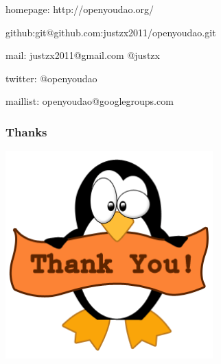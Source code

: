 \documentclass[10pt]{beamer}
\begin{document}
\begin{CJK*}{UTF8}{song}
\begin{frame}
\begin{itemize}
\large{
  \item homepage: http://openyoudao.org/
  \item github:git@github.com:justzx2011/openyoudao.git
  \item mail: justzx2011@gmail.com  @justzx
  \item twitter: @openyoudao
  \item maillist: openyoudao@googlegroups.com
}
  
\end{itemize}

\end{frame}

\begin{frame}
  \frametitle{Thanks}
\begin{center} 
  \includegraphics[width=0.6\textwidth]{thanks.png}
\end{center}
\end{frame}

\end{CJK*}
\end{document}
